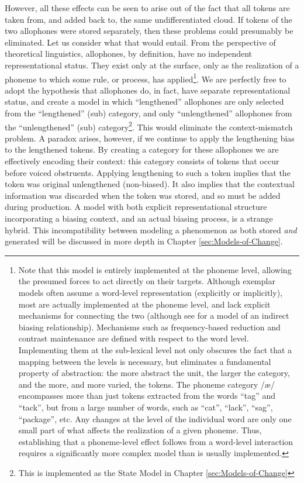 However, all these effects can be seen to arise out of the fact that
all tokens are taken from, and added back to, the same undifferentiated
cloud. If tokens of the two allophones were stored separately, then
these problems could presumably be eliminated. Let us consider what
that would entail. From the perspective of theoretical linguistics,
allophones, by definition, have no independent representational status.
They exist only at the surface, only as the realization of a phoneme
to which some rule, or process, has applied\footnote{Note that this model is entirely implemented at the phoneme level,
allowing the presumed forces to act directly on their targets. Although
exemplar models often assume a word-level representation (explicitly
or implicitly), most are actually implemented at the phoneme level,
and lack explicit mechanisms for connecting the two (although see
\citet{Wedel2008} for a model of an indirect biasing relationship).
Mechanisms such as frequency-based reduction and contrast maintenance
are defined with respect to the word level. Implementing them at the
sub-lexical level not only obscures the fact that a mapping between
the levels is necessary, but eliminates a fundamental property of
abstraction: the more abstract the unit, the larger the category,
and the more, and more varied, the tokens. The phoneme category {/æ/}
encompasses more than just tokens extracted from the words “tag”
and “tack”, but from a large number of words, such as “cat”,
“lack”, “sag”, “package”, etc. Any changes at the
level of the individual word are only one small part of what affects
the realization of a given phoneme. Thus, establishing that a phoneme-level
effect follows from a word-level interaction requires a significantly
more complex model than is usually implemented. }. We are perfectly free to adopt the hypothesis that allophones do,
in fact, have separate representational status, and create a model
in which “lengthened” allophones are only selected from the
“lengthened” (sub) category, and only “unlengthened” allophones
from the “unlengthened” (sub) category\footnote{This is implemented as the State Model in Chapter \ref{sec:Models-of-Change}}.
This would eliminate the context-mismatch problem. A paradox arises,
however, if we continue to apply the lengthening bias to the lengthened
tokens. By creating a category for these allophones we are effectively
encoding their context: this category consists of tokens that occur
before voiced obstruents. Applying lengthening to such a token implies
that the token was original unlengthened (non-biased). It also implies
that the contextual information was discarded when the token was stored,
and so must be added during production. A model with both explicit
representational structure incorporating a biasing context, and an
actual biasing process, is a strange hybrid. This incompatibility
between modeling a phenomenon as both stored \emph{and} generated
will be discussed in more depth in Chapter \ref{sec:Models-of-Change}. 

